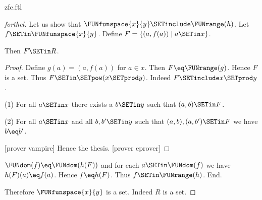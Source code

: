 \documentclass{stex}
\begin{document}
\begin{smodule}{zfc.ftl}
\begin{proof}[forthel]
  Let us show that $\FUNfunspace{x}{y} \SETinclude \FUNrange(h)$.
    Let $f \SETin \FUNfunspace{x}{y}$.
    Define $F = \{ (a,f(a)) \mid a \SETin x \}$.

    Then $F \SETin R$.
    \begin{proof}
      Define $g(a) = (a,f(a))$ for $a \in x$.
      Then $F \eq \FUNrange(g)$.
      Hence $F$ is a set.
      Thus $F \SETin \SETpow(x \SETprod y)$.
      Indeed $F \SETinclude x \SETprod y$.

      (1) For all $a \SETin x$ there exists a $b \SETin y$ such that $(a,b) \SETin F$.

      (2) For all $a \SETin x$ and all $b, b' \SETin y$ such that $(a,b),
      (a,b') \SETin F$ we have $b \eq b'$.

      [prover vampire]
      Hence the thesis.
      [prover eprover]
    \end{proof}

    $\FUNdom(f) \eq \FUNdom(h(F))$ and for each $a \SETin \FUNdom(f)$ we have $h(F)(a) \eq f(a)$.
    Hence $f \eq h(F)$.
    Thus $f \SETin \FUNrange(h)$.
  End.

  Therefore $\FUNfunspace{x}{y}$ is a set.
  Indeed $R$ is a set.
\end{proof}
\end{smodule}
\end{document}
